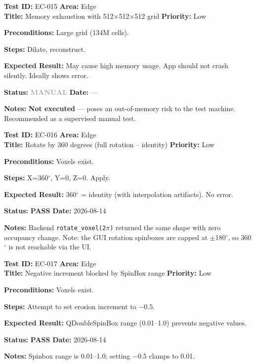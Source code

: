 \documentclass[12pt,a4paper]{article}
\newcommand{\pass}{\textcolor{paleogreen}{\textbf{PASS}}}
\newcommand{\manual}{\textcolor{darkgray}{\textbf{MANUAL}}}
\newcommand{\testheader}[4]{%
  \smallskip
  \noindent\textbf{Test ID:} #1 \hfill \textbf{Area:} #2 \\
  \textbf{Title:} #3 \hfill \textbf{Priority:} #4
}
\newenvironment{testbody}{%
  \begin{description}[leftmargin=2em,style=nextline]
}{%
  \end{description}
  \smallskip
}
\begin{document}
\testheader{EC-015}{Edge}{Memory exhaustion with 512$\times$512$\times$512 grid}{Low}
\begin{testbody}
  \item[\textbf{Preconditions:}] Large grid (134M cells).
  \item[\textbf{Steps:}] Dilate, reconstruct.
  \item[\textbf{Expected Result:}] May cause high memory usage. App should not
        crash silently. Ideally shows error.
  \item[\textbf{Status:}] \manual{} \hspace{1em} \textbf{Date:} ---
  \item[\textbf{Notes:}] \textbf{Not executed} --- poses an out-of-memory risk
        to the test machine. Recommended as a supervised manual test.
\end{testbody}

\testheader{EC-016}{Edge}{Rotate by 360 degrees (full rotation -- identity)}{Low}
\begin{testbody}
  \item[\textbf{Preconditions:}] Voxels exist.
  \item[\textbf{Steps:}] X=360$^\circ$, Y=0, Z=0. Apply.
  \item[\textbf{Expected Result:}] 360$^\circ$ = identity (with interpolation
        artifacts). No error.
  \item[\textbf{Status:}] \pass{} \hspace{1em} \textbf{Date:} 2026-08-14
  \item[\textbf{Notes:}] Backend \texttt{rotate\_voxel(2$\pi$)} returned the
        same shape with zero occupancy change. Note: the GUI rotation spinboxes
        are capped at $\pm$180$^\circ$, so 360$^\circ$ is not reachable via the
        UI.
\end{testbody}

\testheader{EC-017}{Edge}{Negative increment blocked by SpinBox range}{Low}
\begin{testbody}
  \item[\textbf{Preconditions:}] Voxels exist.
  \item[\textbf{Steps:}] Attempt to set erosion increment to $-0.5$.
  \item[\textbf{Expected Result:}] QDoubleSpinBox range (0.01--1.0) prevents
        negative values.
  \item[\textbf{Status:}] \pass{} \hspace{1em} \textbf{Date:} 2026-08-14
  \item[\textbf{Notes:}] Spinbox range is 0.01--1.0; setting $-0.5$ clamps to
        0.01.
\end{testbody}
\end{document}
